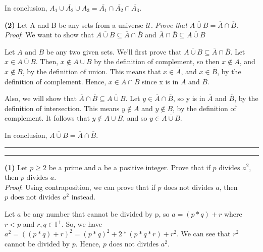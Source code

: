 \documentclass[a4paper, 11pt]{article}
\newcommand{\question}[2] {\vspace{.25in} \hrule\vspace{0.5em}
	\noindent{\bf #1: #2} \vspace{0.5em}
	\hrule \vspace{.10in}}
\renewcommand{\part}[1] {\vspace{.10in} {\bf (#1)}}
\begin{document}
	In conclusion, $ \overline{A_1 \cup A_2 \cup A_3} = \overline{A_1} \cap \overline{A_2} \cap \overline{A_3}$.
	
	
	\part{2} Let A and B be any sets from a universe $\mathcal{U}$. 
	{\em Prove that $ \overline{A \cup B} = \overline{A} \cap \overline{B}$.}\\
	
	{\em Proof}: We want to show that $\overline{A \cup B} \subseteq \overline{A} \cap \overline{B}$
	and $\overline{A} \cap \overline{B} \subseteq \overline{A \cup B} $
	
	Let $A \text{ and } B$ be any two given sets. We'll first prove that
	$\overline{A \cup B} \subseteq \overline{A} \cap \overline{B}$.
	Let $x \in \overline{A \cup B}$. Then, $x \notin A \cup B$ by the definition of complement, so then $x \notin A$, and $x \notin B$, by the definition of union. This means that $x \in \overline{A}$, and $x \in \overline{B}$, by the definition of complement. 
	Hence, $x \in \overline{A} \cap \overline{B}$ 
	since x is in $\overline{A} $ and $ \overline{B}$.
	
	Also, we will show that $\overline{A} \cap \overline{B} \subseteq \overline{A \cup B} $. Let $y \in \overline{A} \cap \overline{B}$, so y is in $\overline{A} $ and $ \overline{B}$, by the definition of intersection. 
	This means $y \notin A$ and $y \notin B$, by the definition of complement. It follows that $y \notin A \cup B$, and so $y \in \overline{A \cup B}$.
	
	In conclusion, $ \overline{A \cup B} = \overline{A} \cap \overline{B}$.

	
	\question{2}{Prime and Irrational}
	
	\part{1} Let $p \geq 2$ be a prime and a be a positive integer. Prove that if $p  \text{ divides } a^2$, then $p \text{ divides } a$.\\
	
	{\em Proof}: Using contraposition, we can prove that if $p \text{ does not divides } a$, then $p \text{ does not divides } a^2$ instead.
	
	Let $a$ be any number that cannot be divided by p, so $ a = (p*q) + r$ where $r < p$ and $r,q \in \mathbb{I^+}$. So, we have $a^2 = ((p*q) + r)^2 = (p*q)^2 + 2*(p*q*r) + r^2$. We can see that $r^2$ cannot be divided by $p$. Hence, $p \text{ does not divides } a^2$. 
	
\end{document}

